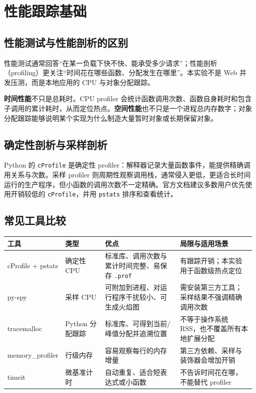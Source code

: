 \documentclass[UTF8,zihao=-4,a4paper]{ctexart}
\newcommand{\term}[1]{\textbf{#1}}
\newcommand{\code}[1]{\texttt{#1}}
\begin{document}
\section{性能跟踪基础}

\subsection{性能测试与性能剖析的区别}

性能测试通常回答“在某一负载下快不快、能承受多少请求”；性能剖析（profiling）更关注“时间花在哪些函数、分配发生在哪里”。本实验不是 Web 并发压测，而是本地应用的 CPU 与对象分配跟踪。

\term{时间性能}不只是总耗时。CPU profiler 会统计函数调用次数、函数自身耗时和包含子调用的累计耗时，从而定位热点。\term{空间性能}也不只是一个进程总内存数字；对象分配跟踪能够说明某个实现为什么制造大量暂时对象或长期保留对象。

\subsection{确定性剖析与采样剖析}

Python 的 \code{cProfile} 是确定性 profiler：解释器记录大量函数事件，能提供精确调用关系与次数。采样 profiler 则周期性观察调用栈，通常侵入更低，更适合长时间运行的生产程序，但小函数的调用次数不一定精确。官方文档建议多数用户优先使用开销较低的 \code{cProfile}，并用 \code{pstats} 排序和查看统计\cite{python-profile}。

\subsection{常见工具比较}

\small
\begin{longtable}{p{}p{}p{}p{}}
\toprule
工具 & 类型 & 优点 & 局限与适用场景 \\
\midrule
\endhead
cProfile + pstats & 确定性 CPU & 标准库、调用次数与累计时间完整、易保存 \code{.prof} & 有跟踪开销；本实验用于函数级热点定位 \\
py-spy & 采样 CPU & 可附加到进程、对运行程序干扰较小、可生成火焰图 & 需安装第三方工具；采样结果不强调精确调用次数 \\
tracemalloc & Python 分配跟踪 & 标准库、可得到当前/峰值分配并追溯位置 & 不等于操作系统 RSS，也不覆盖所有本地扩展分配 \\
memory\_profiler & 行级内存 & 容易观察每行的内存增量 & 第三方依赖、采样与装饰器会增加开销 \\
timeit & 微基准计时 & 自动重复、适合短表达式或小函数 & 不告诉时间花在哪，不能替代 profiler \\
\bottomrule
\end{longtable}
\normalsize
\end{document}
